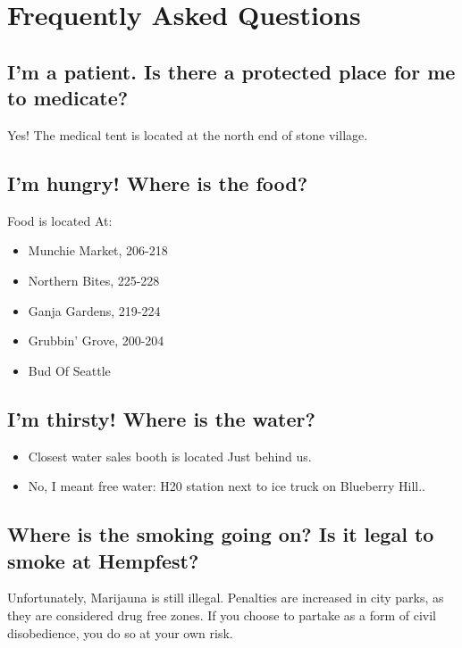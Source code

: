 \chapter{Frequently Asked Questions}


\section{I'm a patient. Is there a protected place for me to medicate?}

Yes! The medical tent is located at the north end of stone village.

\section{I'm hungry! Where is the food?} %
 Food is located At:
\begin{itemize}
	\item Munchie Market, 206-218
	\item Northern Bites, 225-228
	\item Ganja Gardens, 219-224
	\item Grubbin' Grove, 200-204
	\item Bud Of Seattle
\end{itemize}

\section{I'm thirsty! Where is the water?}
\begin{itemize}
	\item Closest water sales booth is located Just behind us.
	\item No, I meant free water: H20 station next to ice truck on Blueberry Hill..
\end{itemize}


\section{Where is the smoking going on? Is it legal to smoke at Hempfest?}
Unfortunately, Marijauna is still illegal. Penalties are increased in city parks, as they are considered drug free zones. If you choose to partake as a form of civil disobedience, you do so at your own risk. 

